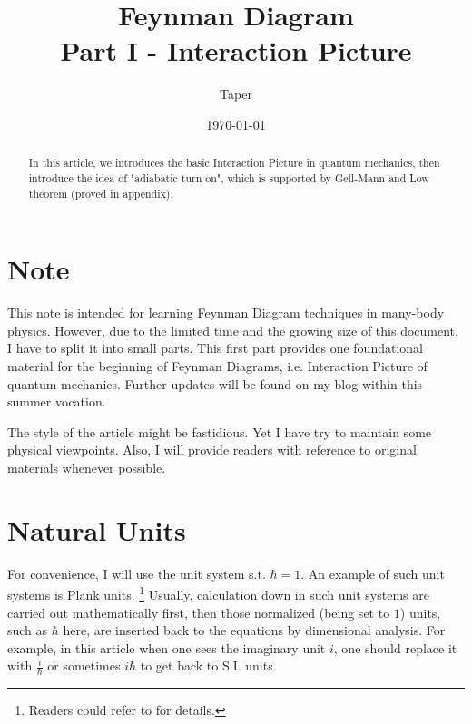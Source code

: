 \documentclass{article}
\title{%
	Feynman Diagram \\
	\large Part I - Interaction Picture}
\date{\today}
\author{Taper}
\numberwithin{equation}{subsection} %
\begin{document}
\maketitle
\tableofcontents

\begin{abstract}
In this article, we introduces the basic Interaction Picture in quantum mechanics, then introduce the idea of "adiabatic turn on", which is supported by Gell-Mann and Low theorem (proved in appendix). 


\end{abstract}

\section{Note}
This note is intended for learning Feynman Diagram techniques in many-body physics. However, due to the limited time and the growing size of this document, I have to split it into small parts. This first part provides one foundational material for the beginning of Feynman Diagrams, i.e. Interaction Picture of quantum mechanics. Further updates will be found on my blog\cite{blog} within this summer vocation.

The style of the article might be fastidious. Yet I have try to maintain some physical viewpoints. Also, I will provide readers with reference to original materials whenever possible.

\section{Natural Units}

For convenience, I will use the unit system s.t. $\hbar=1$. An example of such unit systems is Plank units. 
\footnote{Readers could refer to \cite{wiki:Plank_units} for details.} Usually, calculation down in such unit systems are carried out mathematically first, then those normalized (being set to $1$) units, such as $\hbar$ here, are inserted back to the equations by dimensional analysis. For example, in this article when one sees the imaginary unit $i$, one should replace it with $\frac{i}{\hbar}$ or sometimes $i\hbar$ to get back to S.I. units.
\end{document}
